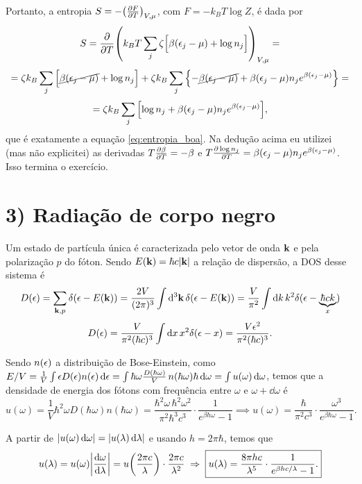 \documentclass[a4paper,10pt]{article}
\begin{document}
Portanto, a entropia $S = -\qty(\pdv{F}{T})_{V,\mu}$, com $F = -k_B T \log Z$, é dada por
$$
S = \pdv{T} \qty(k_B T \sum_{j} \zeta \Big[\beta(\epsilon_j-\mu) + \log n_j\Big])_{V,\mu} =
$$
$$
= \zeta k_B \sum_{j} \Big[\cancel{\beta(\epsilon_j-\mu)} + \log n_j\Big] +
\zeta k_B \sum_{j} \qty{-\cancel{\beta (\epsilon_j - \mu)} + \beta(\epsilon_j-\mu) n_j e^{\beta(\epsilon_j-\mu)}} =
$$
$$
= \zeta k_B \sum_{j} \qty[\log n_j + \beta (\epsilon_j - \mu) n_j e^{\beta(\epsilon_j-\mu)}],
$$
que é exatamente a equação \ref{eq:entropia_boa}. Na dedução acima eu utilizei (mas não explicitei) as derivadas $T \pdv{\beta}{T} = -\beta$ e $T \pdv{\log n_j}{T} = \beta (\epsilon_j-\mu) n_j e^{\beta(\epsilon_j-\mu)}$. Isso termina o exercício.

\pagebreak

\section*{3) Radiação de corpo negro}

Um estado de partícula única é caracterizada pelo vetor de onda $\vb{k}$ e pela polarização $p$ do fóton. Sendo $E(\vb{k}) = \hbar c \abs{\vb{k}}$ a relação de dispersão, a DOS desse sistema é
$$
D(\epsilon) = \sum_{\vb{k},p} \delta(\epsilon-E(\vb{k})) = \frac{2V}{(2\pi)^3} \int \dd[3]{\vb{k}} \delta(\epsilon-E(\vb{k})) =
\frac{V}{\pi^2} \int \dd{k} k^2 \delta(\epsilon-\underbrace{\hbar c k}_{x})
$$
$$
D(\epsilon) = \frac{V}{\pi^2 (\hbar c)^3} \int \dd{x} x^2 \delta(\epsilon-x)
= \frac{V \epsilon^2}{\pi^2 (\hbar c)^3}.
$$

Sendo $n(\epsilon)$ a distribuição de Bose-Einstein, como $E/V = \frac{1}{V} \int \epsilon D(\epsilon) n(\epsilon) \dd{\epsilon} = \int \hbar \omega \frac{D(\hbar\omega)}{V} \, n(\hbar\omega) \hbar \dd{\omega} = \int u(\omega) \dd{\omega}$, temos que a densidade de energia dos fótons com frequência entre $\omega$ e $\omega + \dd{\omega}$ é
$$
u(\omega) = \frac{1}{V} \hbar^2 \omega D(\hbar\omega) n(\hbar\omega) = \frac{\hbar^2 \omega \, \hbar^2 \omega^2}{\pi^2 \hbar^3 c^3} \cdot
\frac{1}{e^{\beta\hbar\omega} - 1} \implies
\boxed{ u(\omega) =
\frac{\hbar}{\pi^2 c^3} \cdot \frac{\omega^3}{e^{\beta\hbar\omega} - 1}. }
$$

A partir de $\abs{u(\omega) \dd{\omega}} = \abs{u(\lambda) \dd{\lambda}}$ e usando $h = 2\pi \hbar$, temos que
$$
u(\lambda) = u(\omega) \abs{\dv{\omega}{\lambda}} = u\qty(\frac{2\pi c}{\lambda}) \cdot \frac{2\pi c}{\lambda^2} \; \Rightarrow \;
\boxed{ u(\lambda) =
\frac{8 \pi h c}{\lambda^5} \cdot \frac{1}{e^{\beta hc / \lambda} - 1}. }
$$
\end{document}
